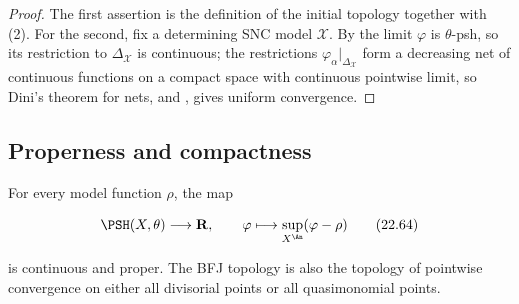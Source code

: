 \begin{proof}
The first assertion is the definition of the initial topology together with
\,(2).  For the second, fix a determining SNC model
$\mathcal X$.  By  the limit
$\varphi$ is $\theta$-psh, so its restriction to
$\Delta_{\mathcal X}$ is continuous; the restrictions
$\varphi_\alpha|_{\Delta_{\mathcal X}}$ form a decreasing net of
continuous functions on a compact space with continuous pointwise limit, so
Dini's theorem for nets,  and
, gives uniform convergence.
\end{proof}

\subsection{Properness and compactness}

\begin{theorem}\label{thm:ch22-proper-normalization}
For every model function $\rho$, the map

\[
 \PSH(X,\theta)\longrightarrow\mathbf R,
 \qquad
 \varphi\longmapsto\sup_{X^{\An}}(\varphi-\rho)
\tag{22.64}\label{eq:ch22-proper-map}
\]

is continuous and proper.  The BFJ topology is also the topology of
pointwise convergence on either all divisorial points or all quasimonomial
points.
\end{theorem}

